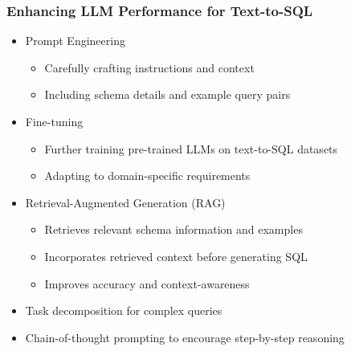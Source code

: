 \begin{frame}\frametitle{Enhancing LLM Performance for Text-to-SQL}
      \begin{itemize}
        \item Prompt Engineering
          \begin{itemize}
            \item Carefully crafting instructions and context
            \item Including schema details and example query pairs
          \end{itemize}
        \item Fine-tuning
          \begin{itemize}
            \item Further training pre-trained LLMs on text-to-SQL datasets
            \item Adapting to domain-specific requirements
          \end{itemize}
        \item Retrieval-Augmented Generation (RAG)
          \begin{itemize}
            \item Retrieves relevant schema information and examples
            \item Incorporates retrieved context before generating SQL
            \item Improves accuracy and context-awareness
          \end{itemize}
        \item Task decomposition for complex queries
        \item Chain-of-thought prompting to encourage step-by-step reasoning
      \end{itemize}
\end{frame}

